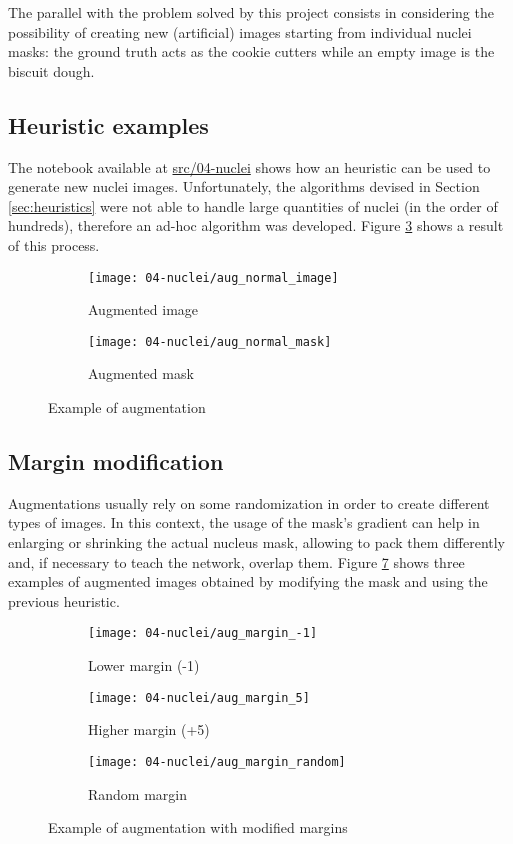 The parallel with the problem solved by this project consists in considering the possibility of creating new (artificial) images starting from individual nuclei masks: the ground truth acts as the cookie cutters while an empty image is the biscuit dough.

\subsection{Heuristic examples}
The notebook available at \href{https://github.com/rb-sl/biscuit_optimizer/blob/main/src/04-nuclei}{src/04-nuclei} shows how an heuristic can be used to generate new nuclei images. Unfortunately, the algorithms devised in Section \ref{sec:heuristics} were not able to handle large quantities of nuclei (in the order of hundreds), therefore an ad-hoc algorithm was developed. Figure \ref{fig:aug_normal} shows a result of this process.
\begin{figure}[H]
	\centering
	\begin{subfigure}[b]{.4\textwidth}
		\centering
		\texttt{[image: 04-nuclei/aug\_normal\_image]}
		\caption{Augmented image}
		\label{fig:aug_image}
	\end{subfigure}
	\begin{subfigure}[b]{.4\textwidth}
		\centering
		\texttt{[image: 04-nuclei/aug\_normal\_mask]}
		\caption{Augmented mask}
		\label{fig:aug_mask}
	\end{subfigure} 
	\caption{Example of augmentation}
	\label{fig:aug_normal}
\end{figure}

\subsection{Margin modification}
Augmentations usually rely on some randomization in order to create different types of images. In this context, the usage of the mask's gradient can help in enlarging or shrinking the actual nucleus mask, allowing to pack them differently and, if necessary to teach the network, overlap them. Figure \ref{fig:aug_margin} shows three examples of augmented images obtained by modifying the mask and using the previous heuristic.
\begin{figure}[H]
	\centering
	\begin{subfigure}[b]{.32\textwidth}
		\centering
		\texttt{[image: 04-nuclei/aug\_margin\_-1]}
		\caption{Lower margin (-1)}
		\label{fig:lower_margin}
	\end{subfigure}
	\begin{subfigure}[b]{.32\textwidth}
		\centering
		\texttt{[image: 04-nuclei/aug\_margin\_5]}
		\caption{Higher margin (+5)}
		\label{fig:higher_margin}
	\end{subfigure} 
	\begin{subfigure}[b]{.32\textwidth}
		\centering
		\texttt{[image: 04-nuclei/aug\_margin\_random]}
		\caption{Random margin}
		\label{fig:random_margin}
	\end{subfigure} 
	\caption{Example of augmentation with modified margins} 
	\label{fig:aug_margin}
\end{figure}
